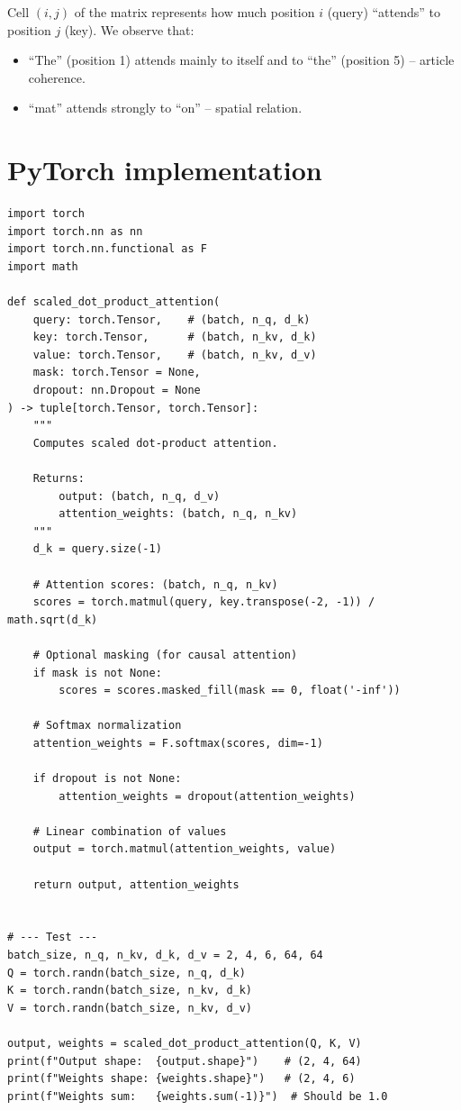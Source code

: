 \begin{remark}
Cell $(i, j)$ of the matrix represents how much position $i$ (query)
``attends'' to position $j$ (key). We observe that:
\begin{itemize}
  \item ``The'' (position 1) attends mainly to itself and to ``the''
    (position 5) -- article coherence.
  \item ``mat'' attends strongly to ``on'' -- spatial relation.
\end{itemize}
\end{remark}

\section{PyTorch implementation}
\label{sec:attention-pytorch}

\begin{codeblock}[title=\textbf{Scaled Dot-Product Attention from scratch}]
\begin{verbatim}
import torch
import torch.nn as nn
import torch.nn.functional as F
import math

def scaled_dot_product_attention(
    query: torch.Tensor,    # (batch, n_q, d_k)
    key: torch.Tensor,      # (batch, n_kv, d_k)
    value: torch.Tensor,    # (batch, n_kv, d_v)
    mask: torch.Tensor = None,
    dropout: nn.Dropout = None
) -> tuple[torch.Tensor, torch.Tensor]:
    """
    Computes scaled dot-product attention.

    Returns:
        output: (batch, n_q, d_v)
        attention_weights: (batch, n_q, n_kv)
    """
    d_k = query.size(-1)

    # Attention scores: (batch, n_q, n_kv)
    scores = torch.matmul(query, key.transpose(-2, -1)) / math.sqrt(d_k)

    # Optional masking (for causal attention)
    if mask is not None:
        scores = scores.masked_fill(mask == 0, float('-inf'))

    # Softmax normalization
    attention_weights = F.softmax(scores, dim=-1)

    if dropout is not None:
        attention_weights = dropout(attention_weights)

    # Linear combination of values
    output = torch.matmul(attention_weights, value)

    return output, attention_weights


# --- Test ---
batch_size, n_q, n_kv, d_k, d_v = 2, 4, 6, 64, 64
Q = torch.randn(batch_size, n_q, d_k)
K = torch.randn(batch_size, n_kv, d_k)
V = torch.randn(batch_size, n_kv, d_v)

output, weights = scaled_dot_product_attention(Q, K, V)
print(f"Output shape:  {output.shape}")    # (2, 4, 64)
print(f"Weights shape: {weights.shape}")   # (2, 4, 6)
print(f"Weights sum:   {weights.sum(-1)}")  # Should be 1.0
\end{verbatim}
\end{codeblock}

